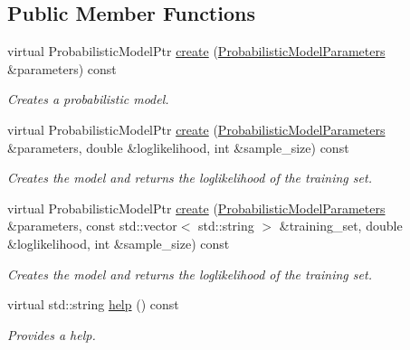 \subsection*{Public Member Functions}
\begin{DoxyCompactItemize}
\item 
virtual Probabilistic\+Model\+Ptr \hyperlink{classtops_1_1TrainVariableLengthMarkovChain_a67d4799e147f66deb1646d1ba45f7e65}{create} (\hyperlink{classtops_1_1ProbabilisticModelParameters}{Probabilistic\+Model\+Parameters} \&parameters) const
\begin{DoxyCompactList}\small\item\em Creates a probabilistic model. \end{DoxyCompactList}\item 
\mbox{\label{classtops_1_1TrainVariableLengthMarkovChain_aed2ad7b84b2e8615077694f1c8fb3a91}} 
virtual Probabilistic\+Model\+Ptr \hyperlink{classtops_1_1TrainVariableLengthMarkovChain_aed2ad7b84b2e8615077694f1c8fb3a91}{create} (\hyperlink{classtops_1_1ProbabilisticModelParameters}{Probabilistic\+Model\+Parameters} \&parameters, double \&loglikelihood, int \&sample\+\_\+size) const
\begin{DoxyCompactList}\small\item\em Creates the model and returns the loglikelihood of the training set. \end{DoxyCompactList}\item 
\mbox{\label{classtops_1_1TrainVariableLengthMarkovChain_ae1ffe7dedad3da1063bb67ed82ccb1a5}} 
virtual Probabilistic\+Model\+Ptr \hyperlink{classtops_1_1TrainVariableLengthMarkovChain_ae1ffe7dedad3da1063bb67ed82ccb1a5}{create} (\hyperlink{classtops_1_1ProbabilisticModelParameters}{Probabilistic\+Model\+Parameters} \&parameters, const std\+::vector$<$ std\+::string $>$ \&training\+\_\+set, double \&loglikelihood, int \&sample\+\_\+size) const
\begin{DoxyCompactList}\small\item\em Creates the model and returns the loglikelihood of the training set. \end{DoxyCompactList}\item 
\mbox{\label{classtops_1_1TrainVariableLengthMarkovChain_a94d82bfb5f7dacfcd94043acf8ebf19c}} 
virtual std\+::string \hyperlink{classtops_1_1TrainVariableLengthMarkovChain_a94d82bfb5f7dacfcd94043acf8ebf19c}{help} () const
\begin{DoxyCompactList}\small\item\em Provides a help. \end{DoxyCompactList}\end{DoxyCompactItemize}


